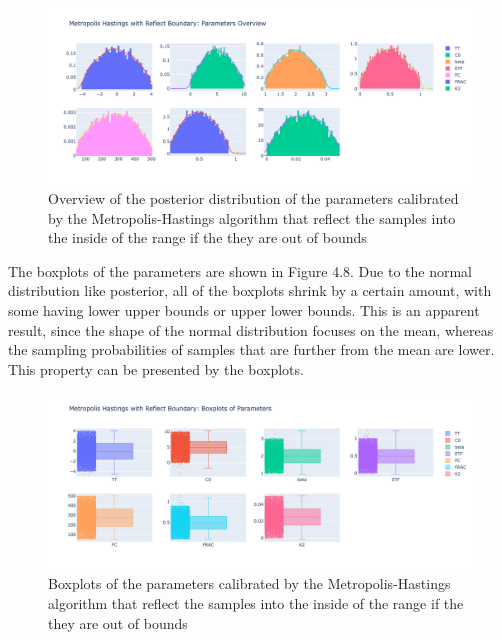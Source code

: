 \begin{figure}[H]
    \centering
    \includegraphics[width=1\textwidth]{figures/basic_mh/rb_mh/rb_mh_parameters_overview.png}
    \captionsetup{width=.8\textwidth}
    \caption{Overview of the posterior distribution of the parameters calibrated by the Metropolis-Hastings algorithm that reflect the samples into the inside of the range if the they are out of bounds}
    \label{fig:enter-label}
\end{figure}

The boxplots of the parameters are shown in Figure 4.8. Due to the normal distribution like posterior, all of the boxplots shrink by a certain amount, with some having lower upper bounds or upper lower bounds. This is an apparent result, since the shape of the normal distribution focuses on the mean, whereas the sampling probabilities of samples that are further from the mean are lower. This property can be presented by the boxplots.

\begin{figure}[H]
    \centering
    \includegraphics[width=1\textwidth]{figures/basic_mh/rb_mh/rb_mh_boxplot.png}
    \captionsetup{width=.8\textwidth}
    \caption{Boxplots of the parameters calibrated by the Metropolis-Hastings algorithm that reflect the samples into the inside of the range if the they are out of bounds}
    \label{fig:enter-label}
\end{figure}



